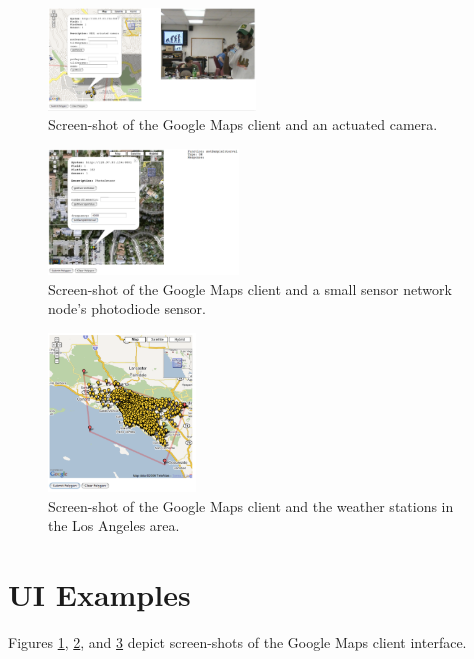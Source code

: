 \begin{figure}[b]
  \begin{center}
  \includegraphics[width=0.49\textwidth]{images/ui1}
  \caption{Screen-shot of the Google Maps client and an actuated camera.}
  \label{fig:ui1}
  \end{center}
\end{figure}

\begin{figure}[h]
  \begin{center}
  \includegraphics[width=0.45\textwidth]{images/ui2}
  \caption{Screen-shot of the Google Maps client and a small sensor
  network node's photodiode sensor.}
  \label{fig:ui2}
  \end{center}
\end{figure}

\begin{figure}[b!]
  \begin{center}
  \includegraphics[width=0.35\textwidth]{images/ui3}
  \caption{Screen-shot of the Google Maps client and the weather
  stations in the Los Angeles area.}
  \label{fig:ui3}
  \end{center}
\end{figure}

\section{UI Examples}
Figures \ref{fig:ui1}, \ref{fig:ui2}, and \ref{fig:ui3} depict screen-shots of the
Google Maps client interface.



